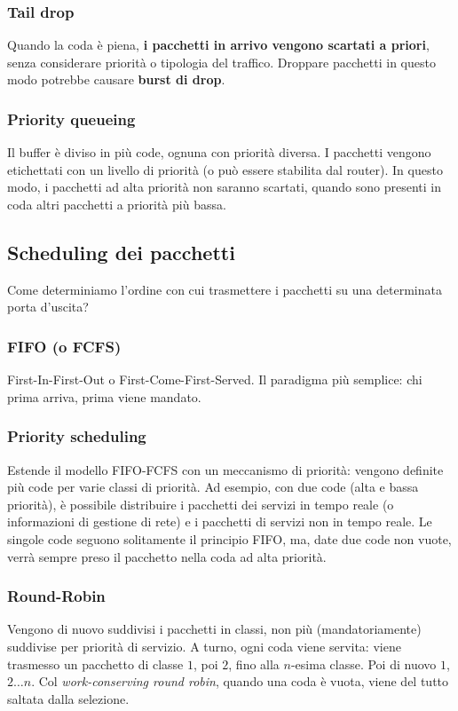 \subsubsection{Tail drop}
Quando la coda è piena, \textbf{i pacchetti in arrivo vengono scartati a priori}, senza considerare priorità o tipologia del traffico. Droppare pacchetti in questo modo potrebbe causare \textbf{burst di drop}.

\subsubsection{Priority queueing}
Il buffer è diviso in più code, ognuna con priorità diversa. I pacchetti vengono etichettati con un livello di priorità (o può essere stabilita dal router). In questo modo, i pacchetti ad alta priorità non saranno scartati, quando sono presenti in coda altri pacchetti a priorità più bassa. 

\subsection{Scheduling dei pacchetti}
Come determiniamo l'ordine con cui trasmettere i pacchetti su una determinata porta d'uscita? 

\subsubsection{FIFO (o FCFS)}
First-In-First-Out o First-Come-First-Served. Il paradigma più semplice: chi prima arriva, prima viene mandato.

\subsubsection{Priority scheduling}
Estende il modello FIFO-FCFS con un meccanismo di priorità: vengono definite più code per varie classi di priorità. Ad esempio, con due code (alta e bassa priorità), è possibile distribuire i pacchetti dei servizi in tempo reale (o informazioni di gestione di rete) e i pacchetti di servizi non in tempo reale. Le singole code seguono solitamente il principio FIFO, ma, date due code non vuote, verrà sempre preso il pacchetto nella coda ad alta priorità.

\subsubsection{Round-Robin}
Vengono di nuovo suddivisi i pacchetti in classi, non più (mandatoriamente) suddivise per priorità di servizio. A turno, ogni coda viene servita: viene trasmesso un pacchetto di classe $1$, poi $2$, fino alla $n$-esima classe. Poi di nuovo $1$, $2\dots n$. Col \textit{work-conserving round robin}, quando una coda è vuota, viene del tutto saltata dalla selezione.

